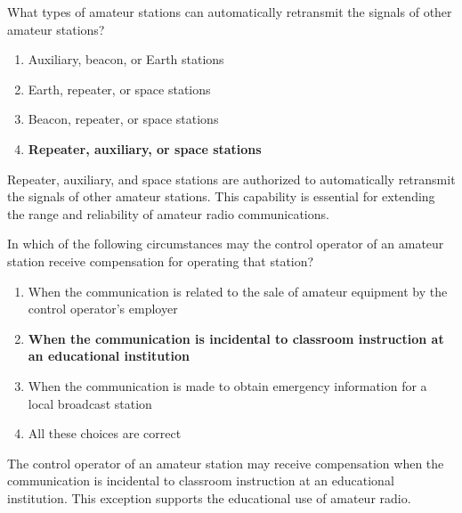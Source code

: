 \begin{tcolorbox}[colback=gray!10!white,colframe=black!75!black,title={T1D07}]
What types of amateur stations can automatically retransmit the signals of other amateur stations?
\begin{enumerate}[label=\Alph*),noitemsep]
    \item Auxiliary, beacon, or Earth stations
    \item Earth, repeater, or space stations
    \item Beacon, repeater, or space stations
    \item \textbf{Repeater, auxiliary, or space stations}
\end{enumerate}
\end{tcolorbox}
Repeater, auxiliary, and space stations are authorized to automatically retransmit the signals of other amateur stations. This capability is essential for extending the range and reliability of amateur radio communications.


\begin{tcolorbox}[colback=gray!10!white,colframe=black!75!black,title={T1D08}]
In which of the following circumstances may the control operator of an amateur station receive compensation for operating that station?
\begin{enumerate}[label=\Alph*),noitemsep]
    \item When the communication is related to the sale of amateur equipment by the control operator's employer
    \item \textbf{When the communication is incidental to classroom instruction at an educational institution}
    \item When the communication is made to obtain emergency information for a local broadcast station
    \item All these choices are correct
\end{enumerate}
\end{tcolorbox}
The control operator of an amateur station may receive compensation when the communication is incidental to classroom instruction at an educational institution. This exception supports the educational use of amateur radio.


